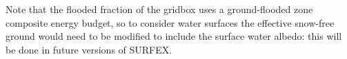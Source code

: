 %
Note that the flooded fraction of the gridbox uses a ground-flooded zone composite
energy budget, so to consider water surfaces the
effective snow-free ground would need to be modified to include the
surface water albedo: this will be done in future versions of SURFEX.
%
%
%
%

